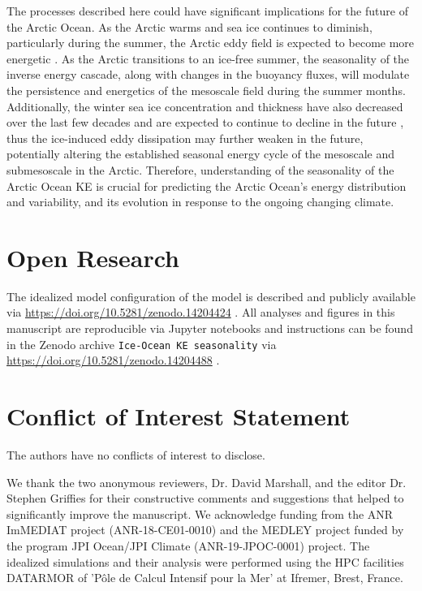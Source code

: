 \documentclass[draft]{agujournal2019}
\begin{document}
The processes described here could have significant implications for the future of the Arctic Ocean. As the Arctic warms and sea ice continues to diminish, particularly during the summer, the Arctic eddy field is expected to become more energetic \citep{Kim_ice_free_2023, Li_eddy_2024}. As the Arctic transitions to an ice-free summer, the seasonality of the inverse energy cascade, along with changes in the buoyancy fluxes, will modulate the persistence and energetics of the mesoscale field during the summer months. Additionally, the winter sea ice concentration and thickness have also decreased over the last few decades and are expected to continue to decline in the future \citep{Wang_ice_trends_2019}, thus the ice-induced eddy dissipation may further weaken in the future, potentially altering the established seasonal energy cycle of the mesoscale and submesoscale in the Arctic. Therefore, understanding of the seasonality of the Arctic Ocean KE is crucial for predicting the Arctic Ocean's energy distribution and variability, and its evolution in response to the ongoing changing climate.

\section{Open Research}
The idealized model configuration of the model is described and publicly available via \url{https://doi.org/10.5281/zenodo.14204424} \citep{martinez_moreno_2024_config}.
All analyses and figures in this manuscript are reproducible via Jupyter notebooks and instructions can be found in the Zenodo archive \texttt{Ice-Ocean KE seasonality} via \url{https://doi.org/10.5281/zenodo.14204488} \citep{martinez_moreno_2024_repository}.

\section{Conflict of Interest Statement}
The authors have no conflicts of interest to disclose.

\acknowledgments
We thank the two anonymous reviewers, Dr. David Marshall, and the editor Dr. Stephen Griffies for their constructive comments and suggestions that helped to significantly improve the manuscript.
We acknowledge funding from the ANR ImMEDIAT project (ANR-18-CE01-0010) and the MEDLEY project funded by the program JPI Ocean/JPI Climate (ANR-19-JPOC-0001) project. The idealized simulations and their analysis were performed using the HPC facilities DATARMOR of ’Pôle de Calcul Intensif pour la Mer’ at Ifremer, Brest, France.


\end{document}
